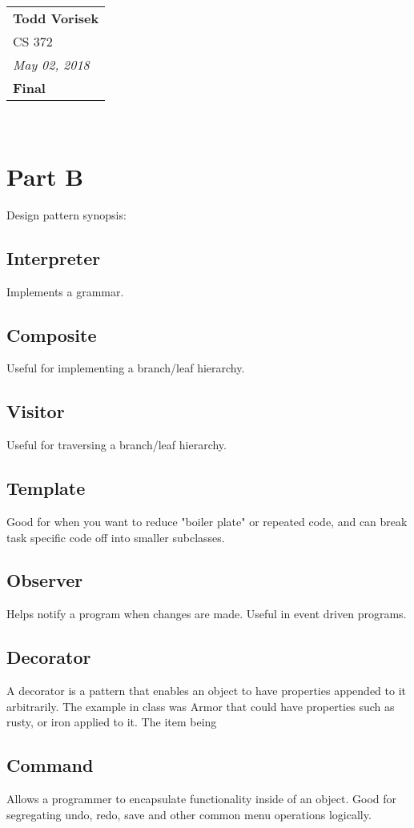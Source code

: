 \documentclass{article}
\begin{document}
  \null\hfill\begin{tabular}[t]{l@{}}
    \textbf{Todd Vorisek} \\
    CS 372 \\
    \textit{May 02, 2018} \\
    \textbf{Final}
  \end{tabular}\\

  \section*{Part B}
    Design pattern synopsis:
    \subsection*{Interpreter}
    Implements a grammar.
    \subsection*{Composite}
    Useful for implementing a branch/leaf hierarchy. 
    \subsection*{Visitor}
    Useful for traversing a branch/leaf hierarchy. 
    \subsection*{Template}
    Good for when you want to reduce "boiler plate" or repeated code, and can break task specific code off into smaller subclasses.
    \subsection*{Observer}
    Helps notify a program when changes are made. Useful in event driven programs.
    \subsection*{Decorator}
    A decorator is a pattern that enables an object to have properties appended to it arbitrarily. The example in class was Armor that could have properties such as rusty, or iron applied to it. The item being 
    \subsection*{Command}
    Allows a programmer to encapsulate functionality inside of an object. Good for segregating undo, redo, save and other common menu operations logically.
\end{document}
